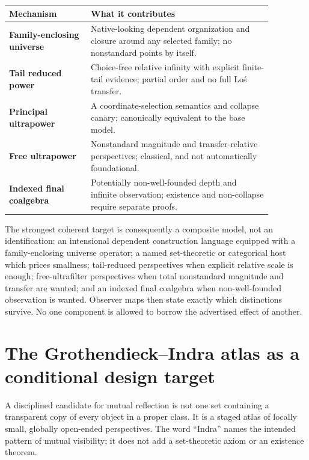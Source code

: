 \documentclass[11pt]{article}
\theoremstyle{definition}
\theoremstyle{remark}
\begin{document}
\begin{center}
\begin{tabular}{>{\raggedright\arraybackslash\bfseries}p{0.27\linewidth}
                >{\raggedright\arraybackslash}p{0.60\linewidth}}
\toprule
Mechanism & What it contributes \\
\midrule
Family-enclosing universe & Native-looking dependent organization and closure
  around any selected family; no nonstandard points by itself. \\
Tail reduced power & Choice-free relative infinity with explicit finite-tail
  evidence; partial order and no full Lo\'s transfer. \\
Principal ultrapower & A coordinate-selection semantics and collapse canary;
  canonically equivalent to the base model. \\
Free ultrapower & Nonstandard magnitude and transfer-relative perspectives;
  classical, and not automatically foundational. \\
Indexed final coalgebra & Potentially non-well-founded depth and infinite
  observation; existence and non-collapse require separate proofs. \\
\bottomrule
\end{tabular}
\end{center}

The strongest coherent target is consequently a composite model, not an
identification: an intensional dependent construction language equipped with a
family-enclosing universe operator; a named set-theoretic or categorical host
which prices smallness; tail-reduced perspectives when explicit relative scale
is enough; free-ultrafilter perspectives when total nonstandard magnitude and
transfer are wanted; and an indexed final coalgebra when non-well-founded
observation is wanted.  Observer maps then state exactly which distinctions
survive.  No one component is allowed to borrow the advertised effect of
another.

\section{The Grothendieck--Indra atlas as a conditional design target}

A disciplined candidate for mutual reflection is not one set containing a
transparent copy of every object in a proper class.  It is a staged atlas of
locally small, globally open-ended perspectives.  The word ``Indra'' names the
intended pattern of mutual visibility; it does not add a set-theoretic axiom or
an existence theorem.
\end{document}
